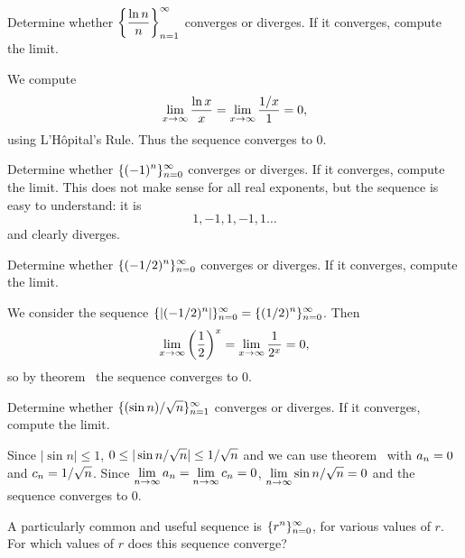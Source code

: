 \begin{example}
Determine whether $\displaystyle\bigg\{{\ln n\over n}\bigg\}_{n=1}^\infty$ converges or
diverges. If it converges, compute the limit.
\end{example}

\begin{solution}We compute
$$\lim_{x\to\infty}{\ln x\over x}=\lim_{x\to\infty}{1/x\over 1}=
0,$$
using L'H\^opital's Rule. 
Thus the sequence converges to 0.
\end{solution}

\begin{example}
Determine whether $\displaystyle\{(-1)^n\}_{n=0}^\infty$ converges or
diverges. If it converges, compute the limit. This does not make sense
for all real exponents, but the sequence is easy to understand: it is
$$1,-1,1,-1,1\ldots$$
and clearly diverges.
\end{example}
\label{example:alternating ones}

\begin{example}
Determine whether $\displaystyle\{(-1/2)^n\}_{n=0}^\infty$ converges or
diverges. If it converges, compute the limit.
\end{example}
\begin{solution}We consider the sequence 
$\displaystyle\{|(-1/2)^n|\}_{n=0}^\infty=\{(1/2)^n\}_{n=0}^\infty$.
Then
$$
  \lim_{x\to\infty}\left({1\over2}\right)^x=\lim_{x\to\infty}{1\over2^x}=0,
$$
so by theorem~ the sequence converges to 0.
\end{solution}

\begin{example}
Determine whether $\displaystyle\{(\sin n)/\sqrt{n}\}_{n=1}^\infty$ converges or
diverges. If it converges, compute the limit. 
\end{example}

\begin{solution}
Since $|\sin n|\le 1$, $\displaystyle 0\le|\sin n/\sqrt{n}|\le
1/\sqrt{n}$ and we can use theorem~ with $\displaystyle a_n=0$ and $\displaystyle c_n=1/\sqrt{n}$. Since
$\displaystyle\lim_{n\to\infty} a_n=\displaystyle\lim_{n\to\infty} c_n=0$, 
$\displaystyle\lim_{n\to\infty}\sin n/\sqrt{n}=0$ and the sequence converges to 0.
\end{solution}

\begin{example}
A particularly common and useful sequence is $\displaystyle \{r^n\}_{n=0}^\infty$,
for various values of $r$.  For which values of $r$ does this sequence converge?
\end{example}


